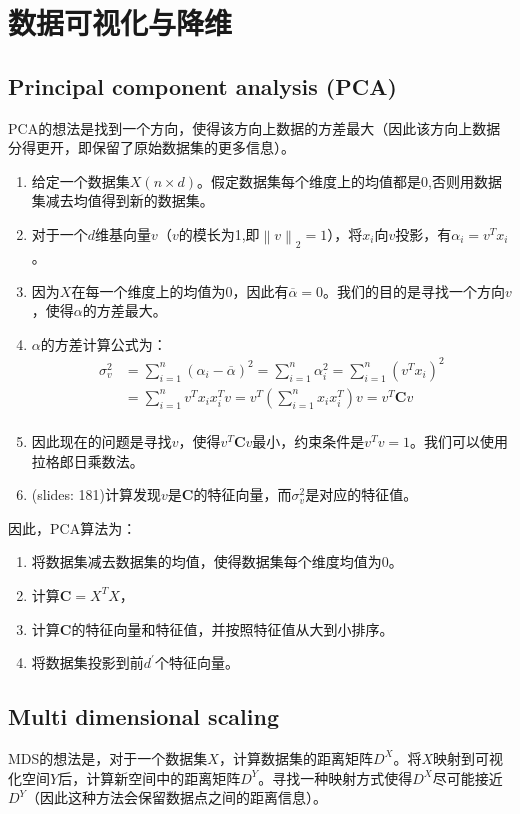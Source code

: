 \documentclass[12pt, a4paper, oneside]{ctexart}
\begin{document}
\section{数据可视化与降维}
\subsection{Principal component analysis (PCA)}
PCA的想法是找到一个方向，使得该方向上数据的方差最大（因此该方向上数据分得更开，即保留了原始数据集的更多信息）。
\begin{enumerate}
    \item 给定一个数据集$X(n\times d)$。假定数据集每个维度上的均值都是0,否则用数据集减去均值得到新的数据集。
    \item 对于一个$d$维基向量$v$（$v$的模长为1,即$\left\|v\right\|_2=1$），将$x_i$向$v$投影，有$\alpha_i=v^Tx_i$。
    \item 因为$X$在每一个维度上的均值为0，因此有$\overline{\alpha}=0 $。我们的目的是寻找一个方向$v$，使得$\alpha$的方差最大。
    \item $\alpha$的方差计算公式为：$$\begin{aligned}
        \sigma_v^2&=\sum_{i=1}^n{(\alpha_i-\overline{\alpha})}^2=\sum_{i=1}^n\alpha_i^2=\sum_{i=1}^n{(v^Tx_i)}^2\\
        &=\sum_{i=1}^nv^Tx_ix_i^Tv=v^T(\sum_{i=1}^nx_ix_i^T)v=v^T\mathbf{C}v\\
    \end{aligned}$$
    \item 因此现在的问题是寻找$v$，使得$v^T\mathbf{C}v$最小，约束条件是$v^Tv=1$。我们可以使用拉格郎日乘数法。
    \item (slides: 181)计算发现$v$是$\mathbf{C}$的特征向量，而$\sigma_v^2$是对应的特征值。
\end{enumerate}
因此，PCA算法为：
\begin{enumerate}
    \item 将数据集减去数据集的均值，使得数据集每个维度均值为0。
    \item 计算$\mathbf{C}=X^TX$，
    \item 计算$\mathbf{C}$的特征向量和特征值，并按照特征值从大到小排序。
    \item 将数据集投影到前$d^\prime$个特征向量。
\end{enumerate}
\subsection{Multi dimensional scaling}
MDS的想法是，对于一个数据集$X$，计算数据集的距离矩阵$D^X$。将$X$映射到可视化空间$Y$后，计算新空间中的距离矩阵$D^Y$。寻找一种映射方式使得$D^X$尽可能接近$D^Y$（因此这种方法会保留数据点之间的距离信息）。
\end{document}
